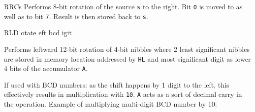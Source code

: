 \begin{basedescript}{
	\desclabelstyle{\multilinelabel}
	\desclabelwidth{3cm}}
\begin{DetailItem}{RRC}{s}
		Performs 8-bit rotation of the source {\tt s} to the right. Bit {\tt 0} is moved to \FlagCF{} as well as to bit {\tt 7}. Result is then stored back to {\tt s}.

		\begin{DetailEffects}[p]
			\FlagsRRCr
		\end{DetailEffects}

		\begin{DetailEffectsFlags}
			\DetailFlagSF{\DetailFlagResultSign}
			\DetailFlagZF{\DetailFlagResultZero}
			\DetailFlagPV{\DetailFlagResultParity}
		\end{DetailEffectsFlags}

		\begin{DetailTiming}
		\end{DetailTiming}

	\end{DetailItem}

	\pagebreak



	\begin{DetailItem}{RLD}{}
		{otate eft bcd igit}
		{\SymRLD}

		Performs leftward 12-bit rotation of 4-bit nibbles where 2 least significant nibbles are stored in memory location addressed by {\tt HL} and most significant digit as lower 4 bits of the accumulator {\tt A}.

		If used with BCD numbers: as the shift happens by 1 digit to the left, this effectively results in multiplication with {\tt 10}. {\tt A} acts as a sort of decimal carry in the operation. Example of multiplying multi-digit BCD number by 10:


\end{DetailItem}
\end{basedescript}
